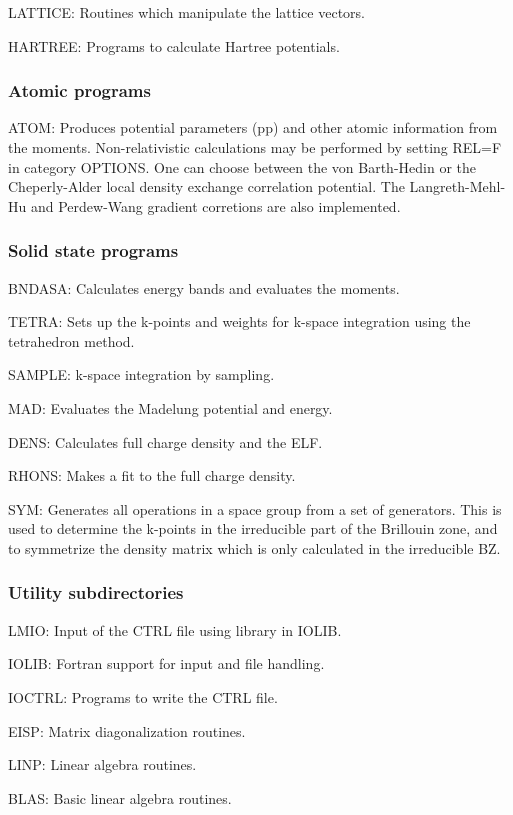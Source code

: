 \documentclass[aps,twocolumn,a4]{revtex4}
\begin{document}
LATTICE: Routines which manipulate the lattice vectors.

HARTREE: Programs to calculate Hartree potentials.

\subsubsection{Atomic programs}

ATOM: Produces potential parameters (pp) and other atomic information
from the moments. Non-relativistic
calculations may be performed by setting REL=F in category OPTIONS.
One can choose between the von Barth-Hedin or the Cheperly-Alder
local density exchange correlation potential. The Langreth-Mehl-Hu and
Perdew-Wang gradient corretions are also implemented.

\subsubsection{Solid state programs}

BNDASA: Calculates energy bands and evaluates the moments.

TETRA: Sets up the k-points and weights for k-space integration using
the tetrahedron method.

SAMPLE: k-space integration by sampling.

MAD: Evaluates the Madelung potential and energy.

DENS: Calculates full charge density and the ELF.

RHONS: Makes a fit to the full charge density.

SYM: Generates all operations in a space group from a set of
generators.  This is used to determine the k-points in the irreducible
part of the Brillouin zone, and to symmetrize the density matrix which
is only calculated in the irreducible BZ.

\subsubsection{Utility subdirectories}

LMIO: Input of the CTRL file using library in IOLIB.

IOLIB: Fortran support for input and file handling.

IOCTRL: Programs to write the CTRL file.

EISP: Matrix diagonalization routines.

LINP: Linear algebra routines.

BLAS: Basic linear algebra routines.
\end{document}
